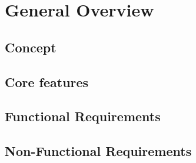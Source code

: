 \chapter{General Overview}

\section{Concept}

\section{Core features}

\section{Functional Requirements}

\section{Non-Functional Requirements}
